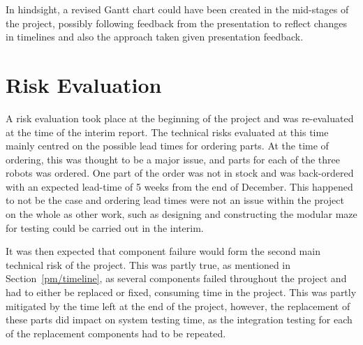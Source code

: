 In hindsight, a revised Gantt chart could have been created in the mid-stages of the project, possibly following feedback from the presentation to reflect changes in timelines and also the approach taken given presentation feedback. 

\section{Risk Evaluation}\label{pm/riskeval}
A risk evaluation took place at the beginning of the project and
was re-evaluated at the time of the interim report. The technical
risks evaluated at this time mainly centred on the possible lead
times for ordering parts. At the time of ordering, this was
thought to be a major issue, and parts for each of the three
robots was ordered. One part of the order
was not in stock and was back-ordered with an expected
lead-time of 5 weeks from the end of December. This happened to
not be the case and ordering lead times were not an issue within
the project on the whole as other work, such as designing and
constructing the modular maze for testing could be carried out in
the interim.

It was then expected that component failure would form the second
main technical risk of the project. This was partly true, as
mentioned in Section~\ref{pm/timeline}, as several components
failed throughout the project and had to either be replaced or
fixed, consuming time in the project. This was partly mitigated by
the time left at the end of the project, however, the replacement
of these parts did impact on system testing time, as the
integration testing for each of the replacement components had to
be repeated.
